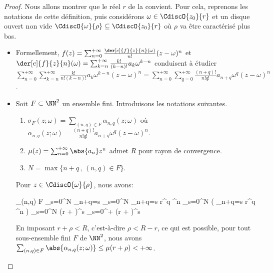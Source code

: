\begin{proof}
	Nous allons montrer que le réel $r$ de la  convient.
	Pour cela, reprenons les notations de cette définition,
	puis
	considérons $\omega \in \CdiscO{z_0}{r}$
    et
    un disque ouvert non vide $\CdiscO{\omega}{\rho} \subseteq \CdiscO{z_0}{r}$ où $\rho$ va être caractérisé plus bas.
	\begin{itemize}
		\item Formellement,
		$f(z) = \sum_{n = 0}^{+\infty} \frac{\der[e]{f}{z}{n}(\omega)}{n!} (z - \omega)^n$
		et
		$\der[e]{f}{z}{n}(\omega) = \sum_{k = n}^{+\infty} \frac{k!}{(k-n)!} a_k \omega^{k - n}$
		conduisent à étudier
		$ \sum_{n = 0}^{+\infty} \sum_{k = n}^{+\infty} \frac{k!}{n! (k-n)!} a_k \omega^{k - n} (z - \omega)^n
		= \sum_{n = 0}^{+\infty} \sum_{q = 0}^{+\infty} \frac{(n+q)!}{n! q!} a_{n+q} \omega^q (z - \omega)^n$.
	

		\item Soit $F \subset \NN^2$ un ensemble fini.
		Introduisons les notations suivantes.
		\begin{enumerate}
			\item $\sigma_F(z ; \omega) = \sum_{(n,q) \in F} \alpha_{n,q}(z ; \omega)$
			où
			$\alpha_{n,q}(z ; \omega) = \frac{(n+q)!}{n! q!} a_{n+q} \omega^q (z - \omega)^n$.

			\item $\mu(z) = \sum_{n = 0}^{+\infty} \abs{a_n} z^n$ admet $R$ pour rayon de convergence.

			\item $N = \max \big\{ n + q \,,\, (n,q) \in F \big\}$.
		\end{enumerate}
		
		\noindent
		Pour $z \in \CdiscO{\omega}{\rho}$, nous avons:
		
		\noindent\kern-6pt
		\begin{stepcalc}[style=sar, ope=\leq]
			\dsum_{(n,q) \in F} 
		\explnext{}
			\dsum_{s=0}^{N} \dsum_{n+q=s} 
		\explnext{}
			\dsum_{s=0}^{N} \dsum_{n+q=s}   r^q \rho^n
		\explnext{}
			\dsum_{s=0}^{N}  \big( \dsum_{n+q=s}  r^q \rho^n \big)
		\explnext{}
			\dsum_{s=0}^{N}  (r + \rho)^s
		\explnext{}
			\dsum_{s=0}^{+\infty}  (r + \rho)^s
		\end{stepcalc}
		
		\noindent
		En imposant $r + \rho < R$, c'est-à-dire $\rho < R - r$, ce qui est possible, 
		pour tout sous-ensemble fini $F$ de $\NN^2$, nous avons
		$\sum_{(n,q) \in F} \abs{\alpha_{n,q}(z ; \omega)} \leq \mu(r + \rho) < +\infty$.
		

\end{itemize}
\end{proof}
